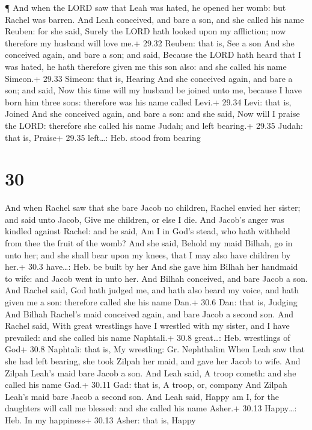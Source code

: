  ¶ And when the LORD saw that Leah was hated, he opened her
womb: but Rachel was barren.  And Leah conceived, and bare
a son, and she called his name Reuben: for she said, Surely the LORD
hath looked upon my affliction; now therefore my husband will love me.+
29.32 Reuben: that is, See a son  And she conceived again,
and bare a son; and said, Because the LORD hath heard that I was hated,
he hath therefore given me this son also: and she called his name
Simeon.+ 29.33 Simeon: that is, Hearing  And she conceived
again, and bare a son; and said, Now this time will my husband be joined
unto me, because I have born him three sons: therefore was his name
called Levi.+ 29.34 Levi: that is, Joined  And she
conceived again, and bare a son: and she said, Now will I praise the
LORD: therefore she called his name Judah; and left bearing.+ 29.35
Judah: that is, Praise+ 29.35 left\ldots: Heb. stood from bearing

\hypertarget{section-29}{%
\section{30}\label{section-29}}

 And when Rachel saw that she bare Jacob no children, Rachel
envied her sister; and said unto Jacob, Give me children, or else I die.
 And Jacob's anger was kindled against Rachel: and he said,
Am I in God's stead, who hath withheld from thee the fruit of the womb?
 And she said, Behold my maid Bilhah, go in unto her; and
she shall bear upon my knees, that I may also have children by her.+
30.3 have\ldots: Heb. be built by her  And she gave him
Bilhah her handmaid to wife: and Jacob went in unto her. 
And Bilhah conceived, and bare Jacob a son.  And Rachel
said, God hath judged me, and hath also heard my voice, and hath given
me a son: therefore called she his name Dan.+ 30.6 Dan: that is, Judging
 And Bilhah Rachel's maid conceived again, and bare Jacob a
second son.  And Rachel said, With great wrestlings have I
wrestled with my sister, and I have prevailed: and she called his name
Naphtali.+ 30.8 great\ldots: Heb. wrestlings of God+ 30.8 Naphtali: that
is, My wrestling: Gr. Nephthalim  When Leah saw that she had
left bearing, she took Zilpah her maid, and gave her Jacob to wife.
 And Zilpah Leah's maid bare Jacob a son.  And
Leah said, A troop cometh: and she called his name Gad.+ 30.11 Gad: that
is, A troop, or, company  And Zilpah Leah's maid bare Jacob
a second son.  And Leah said, Happy am I, for the daughters
will call me blessed: and she called his name Asher.+ 30.13 Happy\ldots:
Heb. In my happiness+ 30.13 Asher: that is, Happy

